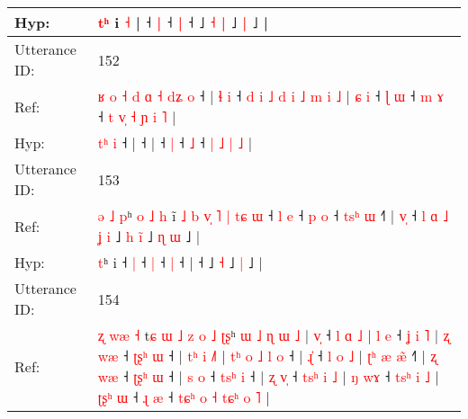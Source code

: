 \documentclass[10pt]{article}
\DeclareRobustCommand{\hl}[1]{{\textcolor{red}{#1}}}
\begin{document}
\begin{longtable}{ll}
 \\
Hyp: & \hl{}\hl{}\hl{}\hl{}\hl{}\hl{t}\hl{ʰ} i\hl{}\hl{}\hl{}\hl{}\hl{}\hl{}\hl{} \hl{˧} |\hl{}\hl{}\hl{}\hl{} ˧\hl{}\hl{}\hl{}\hl{} \hl{}\hl{|} ˧\hl{}\hl{}\hl{} \hl{|} ˧\hl{}\hl{}\hl{}\hl{}\hl{}\hl{}\hl{}\hl{}\hl{}\hl{}\hl{}\hl{}\hl{}\hl{}\hl{}\hl{}\hl{}\hl{}\hl{}\hl{}\hl{}\hl{}\hl{}\hl{}\hl{}\hl{}\hl{}\hl{}\hl{}\hl{}\hl{} ˩ \hl{˧} \hl{|} ˩\hl{}\hl{} \hl{|} ˩ |
 \\
\midrule
Utterance ID: & 152 \\
Ref: & \hl{ʁ}\hl{ }\hl{o}\hl{ }\hl{˧}\hl{ }\hl{d}\hl{ }\hl{ɑ}\hl{ }\hl{˧}\hl{ }\hl{d}\hl{ʑ} \hl{o} ˧ |\hl{ }\hl{ɬ}\hl{ }\hl{i} ˧\hl{ }\hl{d}\hl{ }\hl{i}\hl{ }\hl{˩}\hl{ }\hl{d}\hl{ }\hl{i}\hl{ }\hl{˩}\hl{ }\hl{m}\hl{ }\hl{i}\hl{ }\hl{˩} |\hl{ }\hl{ɕ}\hl{ }\hl{i} ˧\hl{ }\hl{ɭ} \hl{ɯ} ˧\hl{ }\hl{m} \hl{ɤ} ˧\hl{ }\hl{t}\hl{ }\hl{v}\hl{̩} \hl{˧} \hl{ɲ} \hl{i} \hl{˥} |
 \\
Hyp: & \hl{}\hl{}\hl{}\hl{}\hl{}\hl{}\hl{}\hl{}\hl{}\hl{}\hl{}\hl{}\hl{t}\hl{ʰ} \hl{i} ˧ |\hl{}\hl{}\hl{}\hl{} ˧\hl{}\hl{}\hl{}\hl{}\hl{}\hl{}\hl{}\hl{}\hl{}\hl{}\hl{}\hl{}\hl{}\hl{}\hl{}\hl{}\hl{}\hl{} |\hl{}\hl{}\hl{}\hl{} ˧\hl{}\hl{} \hl{|} ˧\hl{}\hl{} \hl{˩} ˧\hl{}\hl{}\hl{}\hl{}\hl{} \hl{|} \hl{˩} \hl{|} \hl{˩} |
 \\
\midrule
Utterance ID: & 153 \\
Ref: & \hl{ə}\hl{ }\hl{˩}\hl{ }\hl{p}ʰ\hl{ }\hl{o}\hl{ }\hl{˩}\hl{ }\hl{h} i\hl{̃}\hl{ }\hl{˩}\hl{ }\hl{b}\hl{ }\hl{v}\hl{̩}\hl{ }\hl{˥}\hl{ }\hl{|}\hl{ }\hl{t}\hl{ɕ}\hl{ }\hl{ɯ} ˧\hl{ }\hl{l} \hl{e} ˧\hl{ }\hl{p} \hl{o} ˧\hl{ }\hl{t}\hl{s}\hl{ʰ} \hl{ɯ} ˧\hl{˥} |\hl{ }\hl{v}\hl{̩} ˧\hl{ }\hl{l}\hl{ }\hl{ɑ}\hl{ }\hl{˩}\hl{ }\hl{ʝ}\hl{ }\hl{i} ˩\hl{ }\hl{h} \hl{i}\hl{̃} ˩\hl{ }\hl{ɳ} \hl{ɯ} ˩ |
 \\
Hyp: & \hl{}\hl{}\hl{}\hl{}\hl{t}ʰ\hl{}\hl{}\hl{}\hl{}\hl{}\hl{} i\hl{}\hl{}\hl{}\hl{}\hl{}\hl{}\hl{}\hl{}\hl{}\hl{}\hl{}\hl{}\hl{}\hl{}\hl{}\hl{}\hl{} ˧\hl{}\hl{} \hl{|} ˧\hl{}\hl{} \hl{|} ˧\hl{}\hl{}\hl{}\hl{} \hl{|} ˧\hl{} |\hl{}\hl{}\hl{} ˧\hl{}\hl{}\hl{}\hl{}\hl{}\hl{}\hl{}\hl{}\hl{}\hl{} ˩\hl{}\hl{} \hl{}\hl{˧} ˩\hl{}\hl{} \hl{|} ˩ |
 \\
\midrule
Utterance ID: & 154 \\
Ref: & \hl{ʐ}\hl{ }\hl{w}\hl{æ}\hl{ }\hl{˧}\hl{ }t\hl{ɕ}\hl{ }\hl{ɯ}\hl{ }\hl{˩}\hl{ }\hl{z}\hl{ }\hl{o}\hl{ }\hl{˩}\hl{ }\hl{ʈ}\hl{ʂ}ʰ\hl{ }\hl{ɯ}\hl{ }\hl{˩}\hl{ }\hl{ɳ} \hl{ɯ} \hl{˩} |\hl{ }\hl{v}\hl{̩} ˧\hl{ }\hl{l}\hl{ }\hl{ɑ}\hl{ }\hl{˩} |\hl{ }\hl{l}\hl{ }\hl{e} ˧\hl{ }\hl{ʝ}\hl{ }\hl{i}\hl{ }\hl{˥} |\hl{ }\hl{ʐ}\hl{ }\hl{w}\hl{æ} ˧\hl{ }\hl{ʈ}\hl{ʂ}\hl{ʰ} \hl{ɯ} ˧ |\hl{ }\hl{t}\hl{ʰ}\hl{ }\hl{i} \hl{˩}\hl{˥} |\hl{ }\hl{t}\hl{ʰ}\hl{ }\hl{o}\hl{ }\hl{˩}\hl{ }\hl{l}\hl{ }\hl{o} ˧ |\hl{ }\hl{ɻ}\hl{̍} ˧\hl{ }\hl{l}\hl{ }\hl{o}\hl{ }\hl{˩} |\hl{ }\hl{ʈ}\hl{ʰ}\hl{ }\hl{æ}\hl{ }\hl{æ}\hl{̃} ˧\hl{˥} |\hl{ }\hl{ʐ}\hl{ }\hl{w}\hl{æ} ˧\hl{ }\hl{ʈ}\hl{ʂ}\hl{ʰ} \hl{ɯ} ˧ |\hl{ }\hl{s}\hl{ }\hl{o} ˧\hl{ }\hl{t}\hl{s}\hl{ʰ} \hl{i} ˧ |\hl{ }\hl{ʐ}\hl{ }\hl{v}\hl{̩} ˧\hl{ }\hl{t}\hl{s}\hl{ʰ}\hl{ }\hl{i}\hl{ }\hl{˩} |\hl{ }\hl{ŋ}\hl{ }\hl{w}\hl{ɤ} ˧\hl{ }\hl{t}\hl{s}\hl{ʰ} \hl{i} \hl{˩} | \hl{ʈ}\hl{ʂ}\hl{ʰ} \hl{ɯ} ˧\hl{ }\hl{ɻ} \hl{æ} ˧\hl{ }\hl{t}\hl{ɕ}\hl{ʰ} \hl{o} \hl{˧} \hl{t}\hl{ɕ}\hl{ʰ} \hl{o} \hl{˥} |

\end{longtable}
\end{document}
